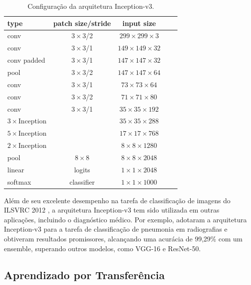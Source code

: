 \begin{table}[h]
    \centering
    \footnotesize
    \begin{tabular}{|l|c|c|c|c|}
        \hline
        \textbf{type} & \textbf{patch size/stride} & \textbf{input size} \\
        \hline
        conv & $3\times3$/2 & $299\times299\times3$ \\
        \hline
        conv & $3\times3$/1 & $149\times149\times32$ \\
        \hline
        conv padded & $3\times3$/1 & $147\times147\times32$ \\
        \hline
        pool & $3\times3$/2 & $147\times147\times64$ \\
        \hline
        conv & $3\times3$/1 & $73\times73\times64$ \\
        \hline
        conv & $3\times3$/2 & $71\times71\times80$ \\
        \hline
        conv & $3\times3$/1 & $35\times35\times192$ \\
        \hline
        $3\times$Inception &  & $35\times35\times288$ \\
        \hline
        $5\times$Inception &  & $17\times17\times768$ \\
        \hline
        $2\times$Inception &  & $8\times8\times1280$ \\
        \hline
        pool & $8\times8$ & $8\times8\times2048$ \\
        \hline
        linear & logits & $1\times1\times2048$ \\
        \hline
        softmax & classifier & $1\times1\times1000$ \\
        \hline
    \end{tabular}
    \caption{Configuração da arquitetura Inception-v3.}
    \label{inception-v3-arch}
\end{table}

Além de seu excelente desempenho na tarefa de classificação de imagens do ILSVRC 2012 \citep{Russakovsky2015}, a arquitetura Inception-v3 tem sido utilizada em outras aplicações, incluindo o diagnóstico médico. Por exemplo, \cite{Mujahid2022} adotaram a arquitetura Inception-v3 para a tarefa de classificação de pneumonia em radiografias e obtiveram resultados promissores, alcançando uma acurácia de 99,29\% com um ensemble, superando outros modelos, como VGG-16 e ResNet-50.

\subsection{Aprendizado por Transferência}

